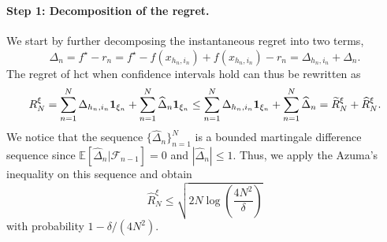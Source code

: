 \paragraph{Step 1: Decomposition of the regret.}
We start by further decomposing the instantaneous regret into two terms,
\[
\Delta_n = f^\star - r_n = f^\star - f(x_{h_n,i_n}) + f(x_{h_n,i_n}) - r_n = \Delta_{h_n,i_n} + \hat{\Delta}_n.
\]
The regret of \gls{hct} when confidence intervals hold can thus be rewritten as
\begin{equation} \label{eq2}
R_N^{\xi} = \sum_{n=1}^N \Delta_{h_n,i_n} {\bf 1}_{\xi_n} + \sum_{n=1}^N \widehat{\Delta}_n {\bf 1}_{\xi_n} \leq \sum_{n=1}^N \Delta_{h_n,i_n} {\bf 1}_{\xi_n} + \sum_{n=1}^N \widehat{\Delta}_n = \widetilde{R}_N^{\xi} + \widehat{R}_N^{\xi}.
\end{equation}
We notice that the sequence $\{\hat{\Delta}_n\}_{n=1}^N$ is a bounded martingale difference sequence since $\mathbb{E}\left[\hat{\Delta}_n|\mathcal{F}_{n-1}\right]=0$ and $|\hat{\Delta}_n|\leq 1$. Thus, we apply the Azuma's inequality on this sequence and obtain
\begin{equation} \label{eq3}
\hat{R}_N^{\xi} \leq \sqrt{2N\log\left(\frac{4N^2}{\delta}\right)}
\end{equation}
with probability $1-\delta/(4N^2)$.


